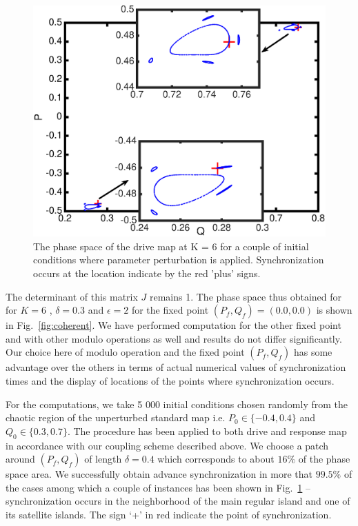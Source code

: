 \documentclass[reprint,superscriptaddress,amsmath,amssymb,aps,pre]{revtex4-1}
\begin{document}
\begin{figure}[t]
	\includegraphics[scale=0.4]{Fast_sync_location.eps}
	\caption{\label{fig:location}\footnotesize The phase space of the drive map at K = 6 for a couple of initial conditions where parameter perturbation is applied. Synchronization occurs at the location indicate by the red 'plus' signs.}
\end{figure}

The determinant of this matrix $J$ remains 1. The phase space thus obtained for for $K = 6$ , $\delta = 0.3$ and $\epsilon = 2$ for the fixed point $(P_f,Q_f)=(0.0,0.0)$ is shown in Fig.~\ref{fig:coherent}.   We have performed computation for the other fixed point and with other modulo operations as well and results do not differ significantly. Our choice here of modulo operation and the fixed point $(P_f,Q_f)$ has some advantage over the others in terms of actual numerical values of synchronization times and the display of locations of the points where synchronization occurs. 

For the computations, we take 5 000 initial conditions chosen randomly from the chaotic region of the unperturbed standard map i.e. $P_0 \in \{-0.4,0.4\}$ and $Q_0 \in \{0.3,0.7\}$.   The procedure has been applied to both drive and response map in accordance with our coupling  scheme described above. We choose a patch around $(P_f,Q_f)$  of length $\delta= 0.4$ which corresponds to about $16\%$ of the phase space area. We successfully obtain advance synchronization in more that $99.5\%$ of the cases among which a  couple of instances  has been shown in Fig.~\ref{fig:location} -- synchronization occurs in the neighborhood of the main regular island and one of its satellite islands.  The sign `+' in red indicate the point of synchronization. 
\end{document}
